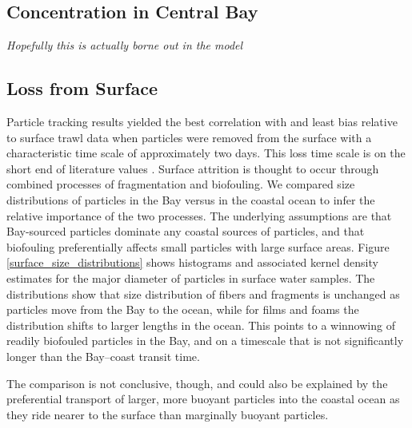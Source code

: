 \documentclass[draft]{jgr/agujournal2019}
\begin{document}
\subsection{Concentration in Central Bay}

{\em Hopefully this is actually borne out in the model}


\subsection{Loss from Surface}

Particle tracking results yielded the best correlation with and least
bias relative to surface trawl data when particles were removed from
the surface with a characteristic time scale of approximately two
days.  This loss time scale is on the short end of literature values
. Surface attrition is thought to occur through
combined processes of fragmentation and biofouling.  We compared size
distributions of particles in the Bay versus in the coastal ocean to
infer the relative importance of the two processes.  The underlying
assumptions are that Bay-sourced particles dominate any coastal
sources of particles, and that biofouling preferentially affects small
particles with large surface areas.  Figure \ref{surface_size_distributions}
shows histograms and associated kernel density estimates for the
major diameter of particles in surface water samples. The distributions
show that size distribution of fibers and fragments is unchanged as particles
move from the Bay to the ocean, while for films and foams the 
distribution shifts to larger lengths in the ocean. This
points to a winnowing of readily biofouled particles in the Bay, and on
a timescale that is not significantly longer than the Bay--coast transit time.

The comparison is not conclusive, though, and could also be explained
by the preferential transport of larger, more buoyant particles into the
coastal ocean as they ride nearer to the surface than marginally buoyant
particles.
\end{document}
